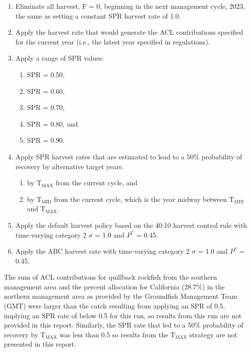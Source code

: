 \documentclass[11pt,
  english,
  a4paper,
]{article}
\begin{document}
\leavevmode\tagmcend\tagstructend\par

\begin{enumerate}
    \item Eliminate all harvest, F = 0, beginning in the next management cycle, 2023, the same as setting a constant SPR harvest rate of 1.0.
    \item Apply the harvest rate that would generate the ACL contributions specified for the current year (i.e., the latest year specified in regulations). 
    \item Apply a range of SPR values: 
    \begin{enumerate}
     \item SPR = 0.50,
     \item SPR = 0.60,
     \item SPR = 0.70,
     \item SPR = 0.80, and
     \item SPR = 0.90. 
    \end{enumerate}
    \item Apply SPR harvest rates that are estimated to lead to a 50$\%$ probability of recovery by alternative target years: 
    \begin{enumerate}
     \item by $\text{T}_\text{MAX}$ from the current cycle, and 
     \item by $\text{T}_\text{MID}$ from the current cycle, which is the year midway between $\text{T}_\text{MIN}$ and $\text{T}_\text{MAX}$.
    \end{enumerate}
    \item Apply the default harvest policy based on the 40:10 harvest control rule with time-varying category 2 $\sigma$ = 1.0 and $P^*$ = 0.45.
    \item Apply the ABC harvest rate with time-varying category 2 $\sigma$ = 1.0 and $P^*$ = 0.45.
\end{enumerate}


The sum of ACL contributions for quillback rockfish from the southern management area and the percent allocation for California (28.7{\(\%\)\leavevmode\tagmcend\tagstructend}) in the northern management area as provided by the Groundfish Management Team (GMT) were larger than the catch resulting from applying an SPR of 0.5, implying an SPR rate of below 0.5 for this run, so results from this run are not provided in this report. Similarly, the SPR rate that led to a 50{\(\%\)\leavevmode\tagmcend\tagstructend} probability of recovery by {\(\text{T}_\text{MAX}\)\leavevmode\tagmcend\tagstructend} was less than 0.5 so results from the {\(\text{T}_\text{MAX}\)\leavevmode\tagmcend\tagstructend} strategy are not presented in this report.
\end{document}
